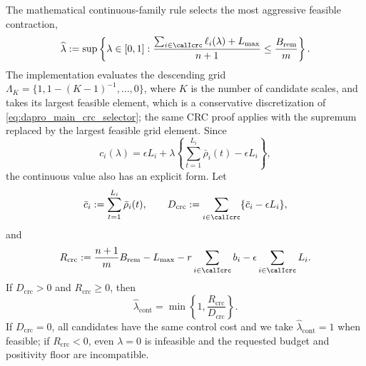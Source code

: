 The mathematical continuous-family rule selects the most aggressive feasible
contraction,
\begin{equation}
    \widehat\lambda
    :=\sup\left\{\lambda\in[0,1]:
      \frac{
        \sum_{i\in\calIcrc}\ell_i(\lambda)+L_{\max}
      }{n+1}
      \leq\frac{B_{\mathrm{rem}}}{m}
    \right\}.
    \label{eq:dapro_main_crc_selector}
\end{equation}
The implementation evaluates the descending grid
$\Lambda_K=\{1,1-(K-1)^{-1},\ldots,0\}$, where $K$ is the number of
candidate scales, and takes its largest feasible
element, which is a conservative discretization of
\eqref{eq:dapro_main_crc_selector}; the same CRC proof applies with the
supremum replaced by the largest feasible grid element.  Since
\begin{equation}
    c_i(\lambda)
      =\epsilon L_i
       +\lambda\left\{
          \sum_{t=1}^{L_i}\bar\rho_i(t)-\epsilon L_i
       \right\},
    \label{eq:dapro_main_crc_linear_cost}
\end{equation}
the continuous value also has an explicit form.  Let
\begin{equation}
    \bar c_i:=\sum_{t=1}^{L_i}\bar\rho_i(t),\qquad
    D_{\mathrm{crc}}:=\sum_{i\in\calIcrc}
       \{\bar c_i-\epsilon L_i\},
    \label{eq:dapro_main_crc_slope}
\end{equation}
and
\begin{equation}
    R_{\mathrm{crc}}
    :=\frac{n+1}{m}B_{\mathrm{rem}}-L_{\max}
      -r\sum_{i\in\calIcrc}b_i
      -\epsilon\sum_{i\in\calIcrc}L_i.
    \label{eq:dapro_main_crc_residual}
\end{equation}
If $D_{\mathrm{crc}}>0$ and $R_{\mathrm{crc}}\geq0$, then
\begin{equation}
    \widehat\lambda_{\mathrm{cont}}
      =\min\left\{1,\frac{R_{\mathrm{crc}}}{D_{\mathrm{crc}}}\right\}.
    \label{eq:dapro_main_crc_closed_form}
\end{equation}
If $D_{\mathrm{crc}}=0$, all candidates have the same control cost and we
take $\widehat\lambda_{\mathrm{cont}}=1$ when feasible; if
$R_{\mathrm{crc}}<0$, even $\lambda=0$ is infeasible and the requested
budget and positivity floor are incompatible.

